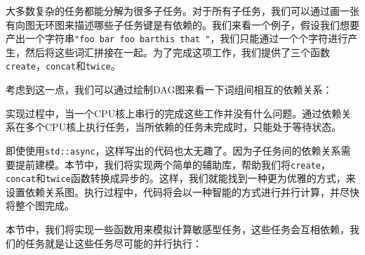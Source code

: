 大多数复杂的任务都能分解为很多子任务。对于所有子任务，我们可以通过画一张有向图无环图来描述哪些子任务键是有依赖的。我们来看一个例子，假设我们想要产出一个字符串\texttt{"foo bar foo barthis that "}，我们只能通过一个个字符进行产生，然后将这些词汇拼接在一起。为了完成这项工作，我们提供了三个函数\texttt{create}，\texttt{concat}和\texttt{twice}。

考虑到这一点，我们可以通过绘制DAG图来看一下词组间相互的依赖关系：


实现过程中，当一个CPU核上串行的完成这些工作并没有什么问题。通过依赖关系在多个CPU核上执行任务，当所依赖的任务未完成时，只能处于等待状态。

即使使用\texttt{std::async}，这样写出的代码也太无趣了。因为子任务间的依赖关系需要提前建模。本节中，我们将实现两个简单的辅助库，帮助我们将\texttt{create}，\texttt{concat}和\texttt{twice}函数转换成异步的。这样，我们就能找到一种更为优雅的方式，来设置依赖关系图。执行过程中，代码将会以一种智能的方式进行并行计算，并尽快将整个图完成。


本节中，我们将实现一些函数用来模拟计算敏感型任务，这些任务会互相依赖，我们的任务就是让这些任务尽可能的并行执行：

